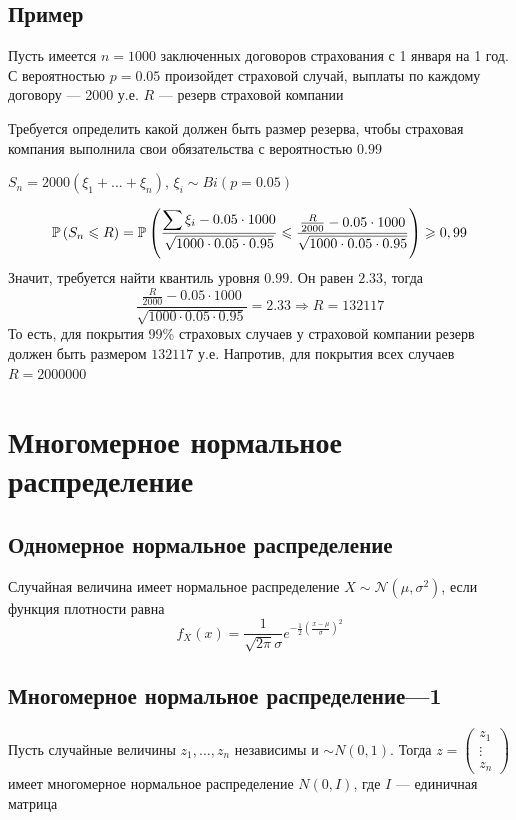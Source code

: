 \documentclass[a4paper, 10pt]{article}
\begin{document}
\subsection*{Пример}
Пусть имеется $n=1000$ заключенных договоров страхования с 1 января на 1 год. С вероятностью $p=0.05$ произойдет страховой случай, выплаты по каждому договору — 2000 у.е. $R$ — резерв страховой компании

Требуется определить какой должен быть размер резерва, чтобы страховая компания выполнила свои обязательства с вероятностью $0.99$

$S_n=2000(\xi_1+\ldots+\xi_n)$, $\xi_i\sim Bi(p=0.05)$

\begin{equation*}
    \prob{S_n\leqslant R}=\prob{\frac{\sum\xi_i-0.05\cdot1000}{\sqrt{1000\cdot0.05\cdot0.95}}\leqslant \frac{\frac{R}{2000}-0.05\cdot1000}{\sqrt{1000\cdot0.05\cdot0.95}}}\geqslant 0,99
\end{equation*}
Значит, требуется найти квантиль уровня $0.99$. Он равен $2.33$, тогда
\begin{equation*}
    \frac{\frac{R}{2000}-0.05\cdot1000}{\sqrt{1000\cdot0.05\cdot0.95}}=2.33\Longrightarrow R=132117
\end{equation*}
То есть, для покрытия 99\% страховых случаев у страховой компании резерв должен быть размером $132117$ у.е. Напротив, для покрытия всех случаев $R=2000000$




\newpage
\section{Многомерное нормальное распределение}
\subsection{Одномерное нормальное распределение}
 Случайная величина имеет нормальное распределение $X\sim\mathcal{N}(\mu,\sigma^2)$, если функция плотности равна
\begin{equation*}
    f_X(x)=\frac{1}{\sqrt{2\pi}\sigma}e^{-\frac{1}{2}\left(\frac{x-\mu}{\sigma}\right)^2}
\end{equation*}


\subsection{Многомерное нормальное распределение—1}
 Пусть случайные величины $z_1,\ldots,z_n$ независимы и $\sim N(0,1)$. Тогда $z=\begin{pmatrix}
    z_1\\
    \vdots\\
    z_n
\end{pmatrix}$ имеет многомерное нормальное распределение $N(0,I)$, где $I$ — единичная матрица
\end{document}
